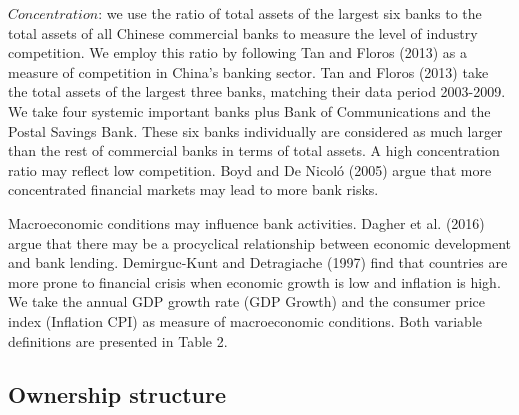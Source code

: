 \documentclass{article}
\begin{document}
\(Concentration\): we use the ratio of total assets of the largest six
banks to the total assets of all Chinese commercial banks to measure the
level of industry competition. We employ this ratio by following Tan and
Floros (2013) as a measure of competition in China's banking sector. Tan
and Floros (2013) take the total assets of the largest three banks,
matching their data period 2003-2009. We take four systemic important
banks plus Bank of Communications and the Postal Savings Bank. These six
banks individually are considered as much larger than the rest of
commercial banks in terms of total assets. A high concentration ratio
may reflect low competition. Boyd and De Nicoló (2005) argue that more
concentrated financial markets may lead to more bank risks.

Macroeconomic conditions may influence bank activities. Dagher et al.
(2016) argue that there may be a procyclical relationship between
economic development and bank lending. Demirguc-Kunt and Detragiache
(1997) find that countries are more prone to financial crisis when
economic growth is low and inflation is high. We take the annual GDP
growth rate (GDP Growth) and the consumer price index (Inflation CPI) as
measure of macroeconomic conditions. Both variable definitions are
presented in Table 2.

\hypertarget{ownership-structure}{%
\subsection{Ownership structure}\label{ownership-structure}}
\end{document}
